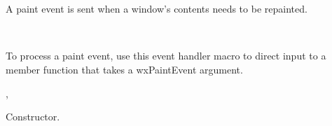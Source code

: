 \section{}\label{wxpaintevent}

A paint event is sent when a window's contents needs to be repainted.


\\


To process a paint event, use this event handler macro to direct input to a member
function that takes a wxPaintEvent argument.

\twocolwidtha{7cm}
\begin{twocollist}\itemsep=0pt
\end{twocollist}%


, 




Constructor.

